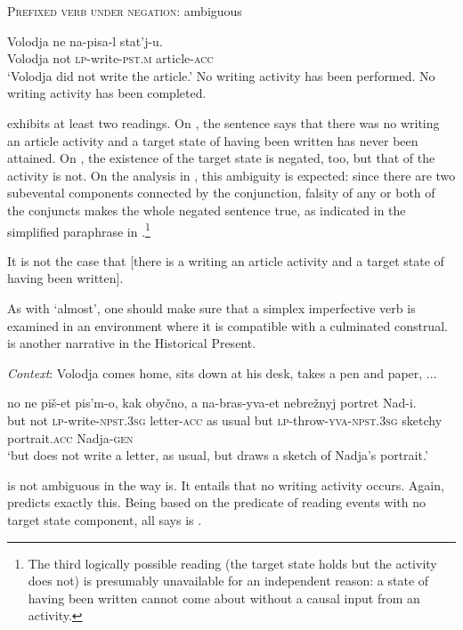 \documentclass[output=paper,colorlinks,citecolor=brown]{langscibook}
\begin{document}
\ea    \textsc{Prefixed verb under negation}: ambiguous\label{tat:ex:46}

\gll  Volodja  ne  na-pisa-l  stat’j-u.\\
  Volodja  not  \textsc{lp}-write-\textsc{pst.m}    article-\textsc{acc}\\
\glt ‘Volodja did not write the article.’
\ea No writing activity has been performed.\label{ex:tatevosov:46a}
\ex No writing activity has been completed.\label{ex:tatevosov:46b}
\z
\z

\noindent {} exhibits at least two readings. On , the sentence says that there was no writing an article activity and a target state of having been written has never been attained. On , the existence of the target state is negated, too, but that of the activity is not. On the analysis in , this ambiguity is expected: since there are two subevental components connected by the conjunction, falsity of any or both of the conjuncts makes the whole negated sentence true, as indicated in the simplified paraphrase in .\footnote{The third logically possible reading (the target state holds but the activity does not) is presumably unavailable for an independent reason: a state of having been written cannot come about without a causal input from an activity.}

\eanoraggedright    It is not the case that [there is a writing an article activity and a target state of having been written].\label{tat:ex:47}
\z

\noindent As with ‘almost’, one should make sure that a simplex imperfective verb is examined in an environment where it is compatible with a culminated construal.  is another narrative in the Historical Present.

\eanoraggedright   \textit{Context}: Volodja comes home, sits down at his desk, takes a pen and paper, ...\label{ex:tatevosov:48}

\gll  no  ne  piš-et  pis’m-o,  kak  obyčno,  a  na-bras-yva-et  nebrežnyj  portret  Nad-i.\\
  but  not  \textsc{lp}-write-\textsc{npst.3sg}  letter-\textsc{acc}  as  usual    but  \textsc{lp}-throw-\textsc{yva-npst.3sg}  sketchy  portrait.\textsc{acc}  Nadja-\textsc{gen}\\
\glt ‘but does not write a letter, as usual, but draws a sketch of Nadja’s portrait.’
\z

\noindent {} is not ambiguous in the way  is. It entails that no writing activity occurs. Again,  predicts exactly this. Being based on the predicate of reading events with no target state component, all  says is .
\end{document}
